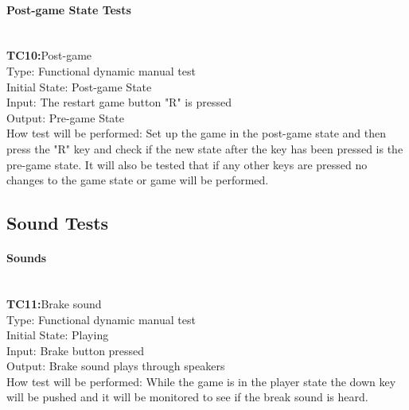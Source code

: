 \documentclass[12pt, titlepage]{article}
\begin{document}
\paragraph{Post-game State Tests\\\\}

\textbf{TC10:}Post-game\\

Type: Functional dynamic manual test\\

Initial State: Post-game State\\

Input: The restart game button "R" is pressed\\

Output: Pre-game State\\

How test will be performed: Set up the game in the post-game state and then press the "R" key and check if the new state after the key has been pressed is the pre-game state. It will also be tested that if any other keys are pressed no changes to the game state or game will be performed.\\

\subsection{Sound Tests}

\paragraph{Sounds\\\\}

\textbf{TC11:}Brake sound\\

Type: Functional dynamic manual test\\

Initial State: Playing\\

Input: Brake button pressed\\

Output: Brake sound plays through speakers\\

How test will be performed: While the game is in the player state the down key will be pushed and it will be monitored to see if the break sound is heard.\\
\end{document}
